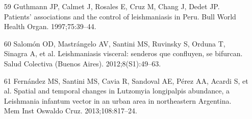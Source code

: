 \documentclass{article}
\begin{document}
\begin{itemize}
\item[59] Guthmann JP, Calmet J, Rosales E, Cruz M, Chang J, Dedet JP.
Patients’ associations and the control of leishmaniasis in Peru. Bull World
Health Organ. 1997;75:39–44.

\item[60] Salomón OD, Mastrángelo AV, Santini MS, Ruvinsky S, Orduna T,
Sinagra A, et al. Leishmaniasis visceral: senderos que confluyen, se bifurcan.
Salud Colectiva (Buenos Aires). 2012;8(S1):49–63.

\item[61] Fernández MS, Santini MS, Cavia R, Sandoval AE, Pérez AA, Acardi S,
et al. Spatial and temporal changes in Lutzomyia longipalpis abundance, a
Leishmania infantum vector in an urban area in northeastern Argentina. Mem Inst
Oswaldo Cruz. 2013;108:817–24.

\end{itemize}
\end{document}
